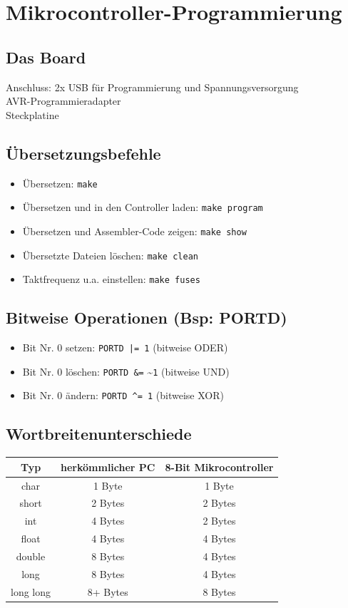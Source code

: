 \documentclass[german]{latex4ei/latex4ei_sheet}
\begin{document}
\section{Mikrocontroller-Programmierung}
\subsection{Das Board}
Anschluss: 2x USB für Programmierung und Spannungsversorgung \\
AVR-Programmieradapter \\
Steckplatine
\subsection{Übersetzungsbefehle}
\begin{itemize}\itemsep0pt
\item Übersetzen: \texttt{make}
\item Übersetzen und in den Controller laden: \texttt{make program}
\item Übersetzen und Assembler-Code zeigen: \texttt{make\ show}
\item Übersetzte Dateien löschen: \texttt{make clean}
\item Taktfrequenz u.a. einstellen: \texttt{make fuses}
\end{itemize}
\subsection{Bitweise Operationen (Bsp: PORTD)}
\begin{itemize}\itemsep0pt
\item Bit Nr. 0 setzen: \texttt{PORTD |= 1} (bitweise ODER)
\item Bit Nr. 0 löschen: \texttt{PORTD \&=} \textasciitilde \texttt{1} (bitweise UND)
\item Bit Nr. 0 ändern: \texttt{PORTD \textasciicircum= 1} (bitweise XOR)
\end{itemize}
\subsection{Wortbreitenunterschiede}
\begin{tabular}{c|c|c}
Typ & herkömmlicher PC & 8-Bit Mikrocontroller \\ \hline
char & 1 Byte & 1 Byte\\
short & 2 Bytes & 2 Bytes \\
int & 4 Bytes & 2 Bytes  \\
float & 4 Bytes & 4 Bytes  \\
double & 8 Bytes & 4 Bytes  \\
long & 8 Bytes & 4 Bytes \\
long long & 8+ Bytes & 8 Bytes  
\end{tabular}
\end{document}
